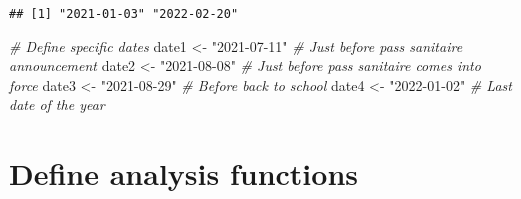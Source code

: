 \documentclass[
]{article}
\newenvironment{Shaded}{\begin{snugshade}}{\end{snugshade}}
\newcommand{\CommentTok}[1]{\textcolor[rgb]{0.56,0.35,0.01}{\textit{#1}}}
\newcommand{\FunctionTok}[1]{\textcolor[rgb]{0.00,0.00,0.00}{#1}}
\newcommand{\NormalTok}[1]{#1}
\newcommand{\OtherTok}[1]{\textcolor[rgb]{0.56,0.35,0.01}{#1}}
\newcommand{\SpecialCharTok}[1]{\textcolor[rgb]{0.00,0.00,0.00}{#1}}
\newcommand{\StringTok}[1]{\textcolor[rgb]{0.31,0.60,0.02}{#1}}
\begin{document}
\begin{Shaded}
\end{Shaded}

\begin{verbatim}
## [1] "2021-01-03" "2022-02-20"
\end{verbatim}

\begin{Shaded}
\begin{Highlighting}[]
\CommentTok{\# Define specific dates}
\NormalTok{date1 }\OtherTok{\textless{}{-}} \StringTok{"2021{-}07{-}11"} \CommentTok{\# Just before pass sanitaire announcement}
\NormalTok{date2 }\OtherTok{\textless{}{-}} \StringTok{"2021{-}08{-}08"} \CommentTok{\# Just before pass sanitaire comes into force}
\NormalTok{date3 }\OtherTok{\textless{}{-}} \StringTok{"2021{-}08{-}29"} \CommentTok{\# Before back to school}
\NormalTok{date4 }\OtherTok{\textless{}{-}} \StringTok{"2022{-}01{-}02"} \CommentTok{\# Last date of the year}
\end{Highlighting}
\end{Shaded}

\hypertarget{define-analysis-functions}{%
\section{Define analysis functions}\label{define-analysis-functions}}
\end{document}
